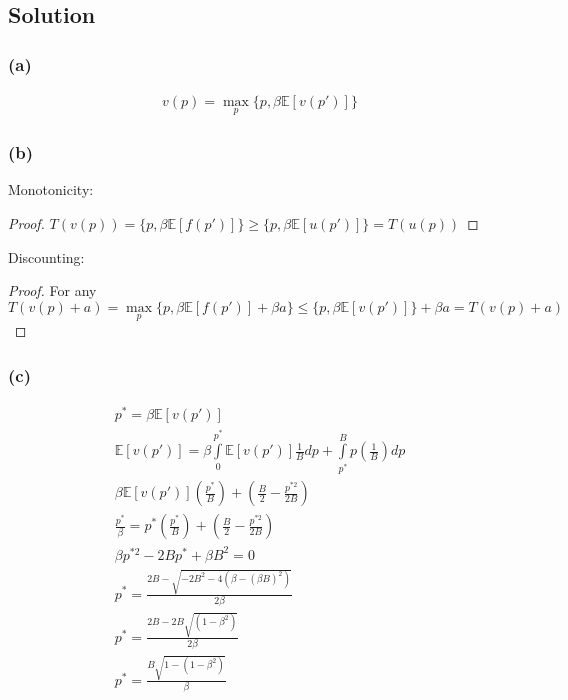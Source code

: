\documentclass[10pt, a4paper]{article}
\begin{document}
  \subsection*{Solution}
  \subsubsection*{(a)}
    \begin{gather*}
      v(p) = \max\limits_p\{p, \beta\mathbb{E}[v(p')]\}
    \end{gather*}
  \subsubsection*{(b)}
    Monotonicity:
    \begin{proof}
      $T(v(p)) = \{p, \beta\mathbb{E}[f(p')]\}\geq\{p,\beta\mathbb{E}[u(p')]\}=T(u(p))$
    \end{proof}
    Discounting:
    \begin{proof}
      For any $T(v(p)+a) = \max\limits_p\{p, \beta\mathbb{E}[f(p')]+\beta a\}\leq\{p, \beta\mathbb{E}[v(p')]\}+\beta a=T(v(p)+a)$
    \end{proof}
  \subsubsection*{(c)}
    \begin{gather*}
      p^* = \beta\mathbb{E}[v(p')]\\
      \mathbb{E}[v(p')] = \beta\int\limits_0^{p^*}\mathbb{E}[v(p')]\frac{1}{B}dp + \int\limits_{p^*}^{B}p(\frac{1}{B})dp\\
      \beta\mathbb{E}[v(p')](\frac{p^*}{B}) + (\frac{B}{2}-\frac{p^{*2}}{2B}) \\
      \frac{p^*}{\beta} = p^*(\frac{p^*}{B})+(\frac{B}{2}-\frac{p^{*2}}{2B}) \\
      \beta p^{*2} -2Bp^*+\beta B^2 = 0 \\
      p^* = \frac{2B - \sqrt{-2B^2 - 4(\beta - (\beta B)^2 )}}{2\beta} \\
      p^* = \frac{2B - 2B\sqrt{(1-\beta^2)}}{2\beta}\\
      \boxed{p^* = \frac{B\sqrt{1-(1-\beta^2)}}{\beta}}
    \end{gather*}
\end{document}
